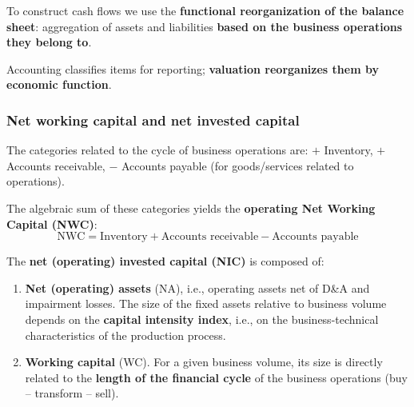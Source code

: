 To construct cash flows we use the \textbf{functional reorganization of the balance sheet}: aggregation of assets and liabilities \textbf{based on the business operations they belong to}.

\begin{center}
\end{center}

\begin{keybox}[Principle]
Accounting classifies items for reporting; \textbf{valuation reorganizes them by economic function}.
\end{keybox}

\subsubsection*{Net working capital and net invested capital}

The categories related to the cycle of business operations are: $+$ Inventory, $+$ Accounts receivable, $-$ Accounts payable (for goods/services related to operations).

\begin{keybox}
The algebraic sum of these categories yields the \textbf{operating Net Working Capital (NWC)}:
\[
\text{NWC} = \text{Inventory} + \text{Accounts receivable} - \text{Accounts payable}
\]
\end{keybox}

The \textbf{net (operating) invested capital (NIC)} is composed of:
\begin{enumerate}
  \item \textbf{Net (operating) assets} (NA), i.e., operating assets net of D\&A and impairment losses. The size of the fixed assets relative to business volume depends on the \textbf{capital intensity index}, i.e., on the business-technical characteristics of the production process.
  \item \textbf{Working capital} (WC). For a given business volume, its size is directly related to the \textbf{length of the financial cycle} of the business operations (buy -- transform -- sell).
\end{enumerate}

